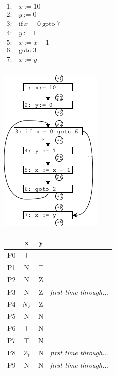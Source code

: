 \documentclass[11pt]{article}
\begin{document}
\tablespace
\begin{center}
\begin{minipage}[t][-9.7em][b]{0.3\textwidth} %
$\begin{array}{ll}
1: & x := 10\\
2: & y := 0\\
3: & \mbox{if}~x=0~\mbox{goto}~7\\
4: & y := 1\\
5: & x := x - 1\\
6: & \mbox{goto}~3\\
7: & x := y\\
\end{array}$
\end{minipage}
\includegraphics[scale=0.8]{images/loop}
\begin{minipage}[t][-9.7em][b]{0.3\textwidth} %
\begin{tabular}{r | c c l}
  & x & y  \\
\hline
P0 & $\top$ & $\top$   \\
P1 & N & $\top$   \\
P2 & N & Z  &   \\
P3 & N & Z  & \textit{first time through...}   \\
P4 & $N_F$ & Z  \\
P5 & N & N \\
P6 & $\top$ & N \\
P7 & $\top$ & N \\
P8 & $Z_t$ & N  & \textit{first time through...}  \\
P9 & N  & N &  \textit{first time through...}   \\
\end{tabular}
\end{minipage}
\end{center}
\tablespace
\end{document}
